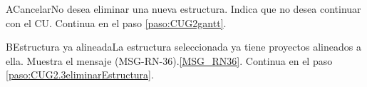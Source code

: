 	\begin{UCtrayectoriaA}{A}{Cancelar}{No desea eliminar una nueva estructura.}
		\UCpaso[\UCactor] Indica que no desea continuar con el CU.
		\UCpaso Continua en el paso \ref{paso:CUG2gantt}.
	\end{UCtrayectoriaA}

	\begin{UCtrayectoriaA}{B}{Estructura ya alineada}{La estructura seleccionada ya tiene proyectos alineados a ella.}
		\UCpaso Muestra el mensaje (MSG-RN-36).\ref{MSG_RN36}.
		\UCpaso Continua en el paso \ref{paso:CUG2.3eliminarEstructura}.
	\end{UCtrayectoriaA}